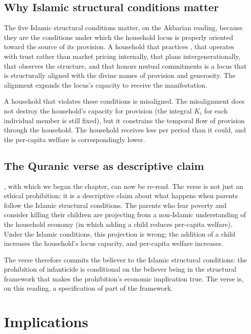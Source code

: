 \subsection{Why Islamic structural conditions matter}

The five Islamic structural conditions matter, on the Akbarian
reading, because they are the conditions under which the household
locus is properly oriented toward the source of its provision. A
household that practices , that operates with
trust rather than market pricing internally, that plans
intergenerationally, that observes the  structure, and
that honors mutual commitments is a locus that is structurally
aligned with the divine names of provision and generosity. The
alignment expands the locus's capacity to receive the
manifestation.

A household that violates these conditions is misaligned. The
misalignment does not destroy the household's capacity for
provision (the integral $K_i$ for each individual member is still
fixed), but it constrains the temporal flow of provision through
the household. The household receives less per period than it
could, and the per-capita welfare is correspondingly lower.

\subsection{The Quranic verse as descriptive claim}

, with which we began the chapter, can now be re-read.
The verse is not just an ethical prohibition; it is a descriptive
claim about what happens when parents follow the Islamic
structural conditions. The parents who fear poverty and consider
killing their children are projecting from a non-Islamic
understanding of the household economy (in which adding a child
reduces per-capita welfare). Under the Islamic conditions, this
projection is wrong; the addition of a child increases the
household's locus capacity, and per-capita welfare increases.

The verse therefore commits the believer to the Islamic structural
conditions: the prohibition of infanticide is conditional on the
believer being in the structural framework that makes the
prohibition's economic implication true. The verse is, on this
reading, a specification of part of the framework.

\section{Implications}
\label{sec:network-implications}

